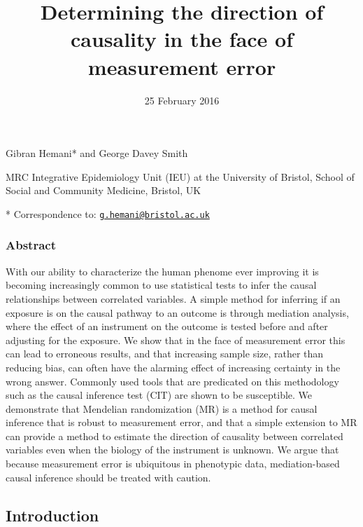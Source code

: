 \documentclass[]{article}
\title{Determining the direction of causality in the face of measurement error}
\author{}
\date{25 February 2016}
\begin{document}
\maketitle


Gibran Hemani* and George Davey Smith

MRC Integrative Epidemiology Unit (IEU) at the University of Bristol,
School of Social and Community Medicine, Bristol, UK

* Correspondence to:
\href{mailto:g.hemani@bristol.ac.uk}{\nolinkurl{g.hemani@bristol.ac.uk}}

\subsubsection{Abstract}\label{abstract}

With our ability to characterize the human phenome ever improving it is
becoming increasingly common to use statistical tests to infer the
causal relationships between correlated variables. A simple method for
inferring if an exposure is on the causal pathway to an outcome is
through mediation analysis, where the effect of an instrument on the
outcome is tested before and after adjusting for the exposure. We show
that in the face of measurement error this can lead to erroneous
results, and that increasing sample size, rather than reducing bias, can
often have the alarming effect of increasing certainty in the wrong
answer. Commonly used tools that are predicated on this methodology such
as the causal inference test (CIT) are shown to be susceptible. We
demonstrate that Mendelian randomization (MR) is a method for causal
inference that is robust to measurement error, and that a simple
extension to MR can provide a method to estimate the direction of
causality between correlated variables even when the biology of the
instrument is unknown. We argue that because measurement error is
ubiquitous in phenotypic data, mediation-based causal inference should
be treated with caution.

\subsection{Introduction}\label{introduction}
\end{document}
